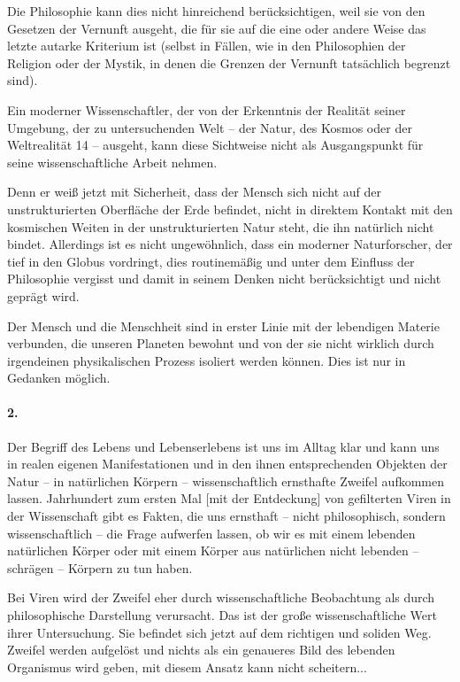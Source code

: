 \documentclass[11pt,a4paper]{book}
\begin{document}
Die Philosophie kann dies nicht hinreichend berücksichtigen, weil sie von den
Gesetzen der Vernunft ausgeht, die für sie auf die eine oder andere Weise das
letzte autarke Kriterium ist (selbst in Fällen, wie in den Philosophien der
Religion oder der Mystik, in denen die Grenzen der Vernunft tatsächlich
begrenzt sind).

Ein moderner Wissenschaftler, der von der Erkenntnis der Realität seiner
Umgebung, der zu untersuchenden Welt -- der Natur, des Kosmos oder der
Weltrealität 14 -- ausgeht, kann diese Sichtweise nicht als Ausgangspunkt für
seine wissenschaftliche Arbeit nehmen.

Denn er weiß jetzt mit Sicherheit, dass der Mensch sich nicht auf der
unstrukturierten Oberfläche der Erde befindet, nicht in direktem Kontakt mit
den kosmischen Weiten in der unstrukturierten Natur steht, die ihn natürlich
nicht bindet. Allerdings ist es nicht ungewöhnlich, dass ein moderner
Naturforscher, der tief in den Globus vordringt, dies routinemäßig und unter
dem Einfluss der Philosophie vergisst und damit in seinem Denken nicht
berücksichtigt und nicht geprägt wird.

Der Mensch und die Menschheit sind in erster Linie mit der lebendigen Materie
verbunden, die unseren Planeten bewohnt und von der sie nicht wirklich durch
irgendeinen physikalischen Prozess isoliert werden können. Dies ist nur in
Gedanken möglich.

\paragraph{2.}
Der Begriff des Lebens und Lebenserlebens ist uns im Alltag klar und kann uns
in realen eigenen Manifestationen und in den ihnen entsprechenden Objekten der
Natur -- in natürlichen Körpern -- wissenschaftlich ernsthafte Zweifel
aufkommen lassen. Jahrhundert zum ersten Mal [mit der Entdeckung] von
gefilterten Viren in der Wissenschaft gibt es Fakten, die uns ernsthaft --
nicht philosophisch, sondern wissenschaftlich -- die Frage aufwerfen lassen,
ob wir es mit einem lebenden natürlichen Körper oder mit einem Körper aus
natürlichen nicht lebenden -- schrägen -- Körpern zu tun haben.

Bei Viren wird der Zweifel eher durch wissenschaftliche Beobachtung als durch
philosophische Darstellung verursacht. Das ist der große wissenschaftliche
Wert ihrer Untersuchung. Sie befindet sich jetzt auf dem richtigen und soliden
Weg. Zweifel werden aufgelöst und nichts als ein genaueres Bild des lebenden
Organismus wird geben, mit diesem Ansatz kann nicht scheitern...
\end{document}
